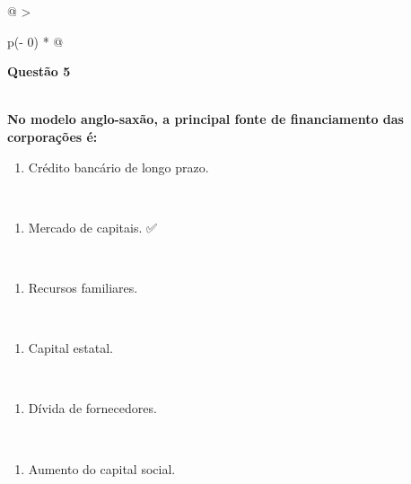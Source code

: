 \documentclass[
]{book}
\providecommand{\tightlist}{%
  \setlength{\itemsep}{0pt}\setlength{\parskip}{0pt}}
\begin{document}
\begin{longtable}[]{@{}
  >{\raggedright\arraybackslash}p{(\columnwidth - 0\tabcolsep) * }@{}}
\toprule\noalign{}
\begin{minipage}[b]{\linewidth}\raggedright
\textbf{Questão 5}
\end{minipage} \\
\midrule\noalign{}
\endhead
\bottomrule\noalign{}
\endlastfoot
\textbf{No modelo anglo-saxão, a principal fonte de financiamento das corporações é:} \\
\begin{minipage}[t]{\linewidth}\raggedright
\begin{enumerate}
\def\labelenumi{\alph{enumi})}
\tightlist
\item
  Crédito bancário de longo prazo.
\end{enumerate}
\end{minipage} \\
\begin{minipage}[t]{\linewidth}\raggedright
\begin{enumerate}
\def\labelenumi{\alph{enumi})}
\setcounter{enumi}{1}
\tightlist
\item
  Mercado de capitais. ✅
\end{enumerate}
\end{minipage} \\
\begin{minipage}[t]{\linewidth}\raggedright
\begin{enumerate}
\def\labelenumi{\alph{enumi})}
\setcounter{enumi}{2}
\tightlist
\item
  Recursos familiares.
\end{enumerate}
\end{minipage} \\
\begin{minipage}[t]{\linewidth}\raggedright
\begin{enumerate}
\def\labelenumi{\alph{enumi})}
\setcounter{enumi}{3}
\tightlist
\item
  Capital estatal.
\end{enumerate}
\end{minipage} \\
\begin{minipage}[t]{\linewidth}\raggedright
\begin{enumerate}
\def\labelenumi{\alph{enumi})}
\setcounter{enumi}{4}
\tightlist
\item
  Dívida de fornecedores.
\end{enumerate}
\end{minipage} \\
\begin{minipage}[t]{\linewidth}\raggedright
\begin{enumerate}
\def\labelenumi{\alph{enumi})}
\setcounter{enumi}{4}
\tightlist
\item
  Aumento do capital social.
\end{enumerate}
\end{minipage} \\
\end{longtable}
\end{document}
